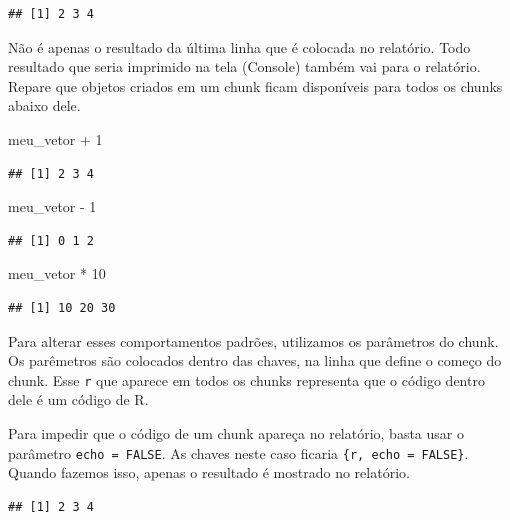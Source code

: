 \documentclass[
]{article}
\newenvironment{Shaded}{\begin{snugshade}}{\end{snugshade}}
\newcommand{\DecValTok}[1]{\textcolor[rgb]{0.00,0.00,0.81}{#1}}
\newcommand{\NormalTok}[1]{#1}
\newcommand{\SpecialCharTok}[1]{\textcolor[rgb]{0.00,0.00,0.00}{#1}}
\begin{document}
\begin{verbatim}
## [1] 2 3 4
\end{verbatim}

Não é apenas o resultado da última linha que é colocada no relatório.
Todo resultado que seria imprimido na tela (Console) também vai para o
relatório. Repare que objetos criados em um chunk ficam disponíveis para
todos os chunks abaixo dele.

\begin{Shaded}
\begin{Highlighting}[]
\NormalTok{meu\_vetor }\SpecialCharTok{+} \DecValTok{1}
\end{Highlighting}
\end{Shaded}

\begin{verbatim}
## [1] 2 3 4
\end{verbatim}

\begin{Shaded}
\begin{Highlighting}[]
\NormalTok{meu\_vetor }\SpecialCharTok{{-}} \DecValTok{1}
\end{Highlighting}
\end{Shaded}

\begin{verbatim}
## [1] 0 1 2
\end{verbatim}

\begin{Shaded}
\begin{Highlighting}[]
\NormalTok{meu\_vetor }\SpecialCharTok{*} \DecValTok{10}
\end{Highlighting}
\end{Shaded}

\begin{verbatim}
## [1] 10 20 30
\end{verbatim}

Para alterar esses comportamentos padrões, utilizamos os parâmetros do
chunk. Os parêmetros são colocados dentro das chaves, na linha que
define o começo do chunk. Esse \texttt{r} que aparece em todos os chunks
representa que o código dentro dele é um código de R.

Para impedir que o código de um chunk apareça no relatório, basta usar o
parâmetro \texttt{echo\ =\ FALSE}. As chaves neste caso ficaria
\texttt{\{r,\ echo\ =\ FALSE\}}. Quando fazemos isso, apenas o resultado
é mostrado no relatório.

\begin{verbatim}
## [1] 2 3 4
\end{verbatim}
\end{document}

